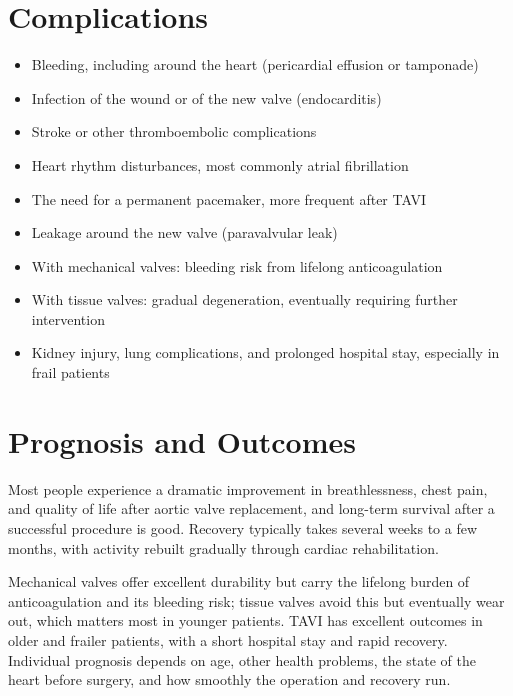 \section*{Complications}
\begin{itemize}
    \item Bleeding, including around the heart (pericardial effusion or tamponade)
    \item Infection of the wound or of the new valve (endocarditis)
    \item Stroke or other thromboembolic complications
    \item Heart rhythm disturbances, most commonly atrial fibrillation
    \item The need for a permanent pacemaker, more frequent after TAVI
    \item Leakage around the new valve (paravalvular leak)
    \item With mechanical valves: bleeding risk from lifelong anticoagulation
    \item With tissue valves: gradual degeneration, eventually requiring further intervention
    \item Kidney injury, lung complications, and prolonged hospital stay, especially in frail patients
\end{itemize}

\section*{Prognosis and Outcomes}
Most people experience a dramatic improvement in breathlessness, chest pain, and quality of life after aortic valve replacement, and long-term survival after a successful procedure is good. Recovery typically takes several weeks to a few months, with activity rebuilt gradually through cardiac rehabilitation.

Mechanical valves offer excellent durability but carry the lifelong burden of anticoagulation and its bleeding risk; tissue valves avoid this but eventually wear out, which matters most in younger patients. TAVI has excellent outcomes in older and frailer patients, with a short hospital stay and rapid recovery. Individual prognosis depends on age, other health problems, the state of the heart before surgery, and how smoothly the operation and recovery run.

